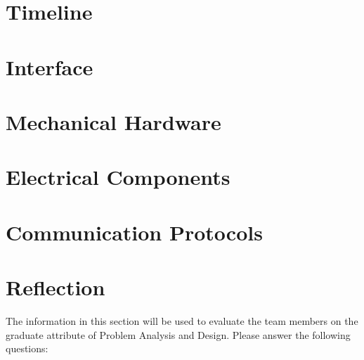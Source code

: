 \documentclass[12pt, titlepage]{article}
\begin{document}

\section{Timeline}


% 

\newpage{}

\appendix

\section{Interface}


\section{Mechanical Hardware}

\section{Electrical Components}

\section{Communication Protocols}

\section{Reflection}

The information in this section will be used to evaluate the team members on the
graduate attribute of Problem Analysis and Design.  Please answer the following questions:
\end{document}
